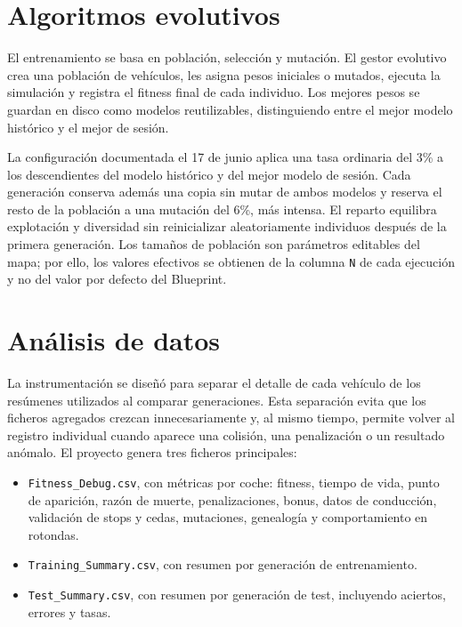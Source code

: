 \section{Algoritmos evolutivos}

El entrenamiento se basa en población, selección y mutación. El gestor evolutivo crea una población de vehículos, les asigna pesos iniciales o mutados, ejecuta la simulación y registra el fitness final de cada individuo. Los mejores pesos se guardan en disco como modelos reutilizables, distinguiendo entre el mejor modelo histórico y el mejor de sesión.

La configuración documentada el 17 de junio aplica una tasa ordinaria del 3\% a los descendientes del modelo histórico y del mejor modelo de sesión. Cada generación conserva además una copia sin mutar de ambos modelos y reserva el resto de la población a una mutación del 6\%, más intensa. El reparto equilibra explotación y diversidad sin reinicializar aleatoriamente individuos después de la primera generación. Los tamaños de población son parámetros editables del mapa; por ello, los valores efectivos se obtienen de la columna \texttt{N} de cada ejecución y no del valor por defecto del Blueprint.

\section{Análisis de datos}

La instrumentación se diseñó para separar el detalle de cada vehículo de los resúmenes utilizados al comparar generaciones. Esta separación evita que los ficheros agregados crezcan innecesariamente y, al mismo tiempo, permite volver al registro individual cuando aparece una colisión, una penalización o un resultado anómalo. El proyecto genera tres ficheros principales:

\begin{itemize}[leftmargin=*]
  \item \texttt{Fitness\_Debug.csv}, con métricas por coche: fitness, tiempo de vida, punto de aparición, razón de muerte, penalizaciones, bonus, datos de conducción, validación de stops y cedas, mutaciones, genealogía y comportamiento en rotondas.
  \item \texttt{Training\_Summary.csv}, con resumen por generación de entrenamiento.
  \item \texttt{Test\_Summary.csv}, con resumen por generación de test, incluyendo aciertos, errores y tasas.
\end{itemize}

